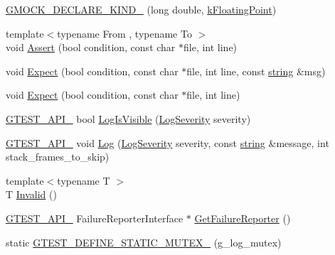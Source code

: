 \begin{DoxyCompactItemize}
\item 
\hyperlink{namespacetesting_1_1internal_af46fdd94d8aea0da729b554de443315f}{G\+M\+O\+C\+K\+\_\+\+D\+E\+C\+L\+A\+R\+E\+\_\+\+K\+I\+N\+D\+\_\+} (long double, \hyperlink{namespacetesting_1_1internal_aa8747bda20137c9aa7f846dee830e686acdce59b8c136926ace18aa9c2995878d}{k\+Floating\+Point})
\item 
{\footnotesize template$<$typename From , typename To $>$ }\\void \hyperlink{namespacetesting_1_1internal_a7a259643b7f2d23ce2b757728df42c99}{Assert} (bool condition, const char $\ast$file, int line)
\item 
void \hyperlink{namespacetesting_1_1internal_ab3000fc56be000e4fa6ed7cdcfee3106}{Expect} (bool condition, const char $\ast$file, int line, const \hyperlink{namespacetesting_1_1internal_a8e8ff5b11e64078831112677156cb111}{string} \&msg)
\item 
void \hyperlink{namespacetesting_1_1internal_a0dfe8a755bd02aa5ea162764b61a9d97}{Expect} (bool condition, const char $\ast$file, int line)
\item 
\hyperlink{gtest-port_8h_aa73be6f0ba4a7456180a94904ce17790}{G\+T\+E\+S\+T\+\_\+\+A\+P\+I\+\_\+} bool \hyperlink{namespacetesting_1_1internal_a69ffdba5ee36743e88d8f89b79e566ff}{Log\+Is\+Visible} (\hyperlink{namespacetesting_1_1internal_a203d1a8a2147a53d12bbdae40d443914}{Log\+Severity} severity)
\item 
\hyperlink{gtest-port_8h_aa73be6f0ba4a7456180a94904ce17790}{G\+T\+E\+S\+T\+\_\+\+A\+P\+I\+\_\+} void \hyperlink{namespacetesting_1_1internal_ac0bc151763a8187d74387c4b2ba685c9}{Log} (\hyperlink{namespacetesting_1_1internal_a203d1a8a2147a53d12bbdae40d443914}{Log\+Severity} severity, const \hyperlink{namespacetesting_1_1internal_a8e8ff5b11e64078831112677156cb111}{string} \&message, int stack\+\_\+frames\+\_\+to\+\_\+skip)
\item 
{\footnotesize template$<$typename T $>$ }\\T \hyperlink{namespacetesting_1_1internal_a3316c24e8a79f5def3e85d763ae50854}{Invalid} ()
\item 
\hyperlink{gtest-port_8h_aa73be6f0ba4a7456180a94904ce17790}{G\+T\+E\+S\+T\+\_\+\+A\+P\+I\+\_\+} Failure\+Reporter\+Interface $\ast$ \hyperlink{namespacetesting_1_1internal_aa261c22df383e9007129c92e36e30e62}{Get\+Failure\+Reporter} ()
\item 
static \hyperlink{namespacetesting_1_1internal_a65647f11a4a74a4282c3cc6d422af0f1}{G\+T\+E\+S\+T\+\_\+\+D\+E\+F\+I\+N\+E\+\_\+\+S\+T\+A\+T\+I\+C\+\_\+\+M\+U\+T\+E\+X\+\_\+} (g\+\_\+log\+\_\+mutex)

\end{DoxyCompactItemize}
